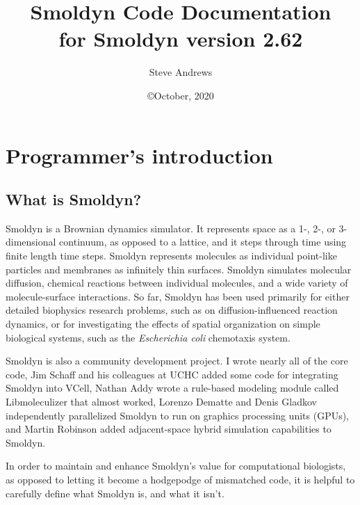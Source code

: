 \documentclass {book}
\begin{document}



\title{\textbf{Smoldyn Code Documentation} \\ \large for Smoldyn version 2.62}
\date{\copyright October, 2020}
\author{Steve Andrews}
\maketitle

\tableofcontents


\chapter{Programmer's introduction}

\section{What is Smoldyn?}

Smoldyn is a Brownian dynamics simulator. It represents space as a 1-, 2-, or 3-dimensional continuum, as opposed to a lattice, and it steps through time using finite length time steps. Smoldyn represents molecules as individual point-like particles and membranes as infinitely thin surfaces. Smoldyn simulates molecular diffusion, chemical reactions between individual molecules, and a wide variety of molecule-surface interactions. So far, Smoldyn has been used primarily for either detailed biophysics research problems, such as on diffusion-influenced reaction dynamics, or for investigating the effects of spatial organization on simple biological systems, such as the \emph{Escherichia coli} chemotaxis system.

Smoldyn is also a community development project. I wrote nearly all of the core code, Jim Schaff and his colleagues at UCHC added some code for integrating Smoldyn into VCell, Nathan Addy wrote a rule-based modeling module called Libmoleculizer that almost worked, Lorenzo Dematte and Denis Gladkov independently parallelized Smoldyn to run on graphics processing units (GPUs), and Martin Robinson added adjacent-space hybrid simulation capabilities to Smoldyn.

In order to maintain and enhance Smoldyn's value for computational biologists, as opposed to letting it become a hodgepodge of mismatched code, it is helpful to carefully define what Smoldyn is, and what it isn't.
\end{document}
